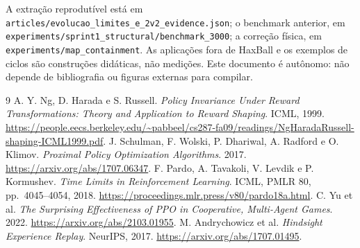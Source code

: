 \documentclass[11pt,a4paper]{article}
\newcommand{\code}[1]{\nolinkurl{#1}}
\begin{document}
A extração reprodutível está em \code{articles/evolucao_limites_e_2v2_evidence.json}; o benchmark anterior, em \code{experiments/sprint1_structural/benchmark_3000}; a correção física, em \code{experiments/map_containment}. As aplicações fora de HaxBall e os exemplos de ciclos são construções didáticas, não medições. Este documento é autônomo: não depende de bibliografia ou figuras externas para compilar.

\begin{thebibliography}{9}
 A. Y. Ng, D. Harada e S. Russell.
\emph{Policy Invariance Under Reward Transformations: Theory and Application to Reward Shaping}. ICML, 1999.
\url{https://people.eecs.berkeley.edu/~pabbeel/cs287-fa09/readings/NgHaradaRussell-shaping-ICML1999.pdf}.
 J. Schulman, F. Wolski, P. Dhariwal, A. Radford e O. Klimov.
\emph{Proximal Policy Optimization Algorithms}. 2017.
\url{https://arxiv.org/abs/1707.06347}.
 F. Pardo, A. Tavakoli, V. Levdik e P. Kormushev.
\emph{Time Limits in Reinforcement Learning}. ICML, PMLR 80, pp.~4045--4054, 2018.
\url{https://proceedings.mlr.press/v80/pardo18a.html}.
 C. Yu et al.
\emph{The Surprising Effectiveness of PPO in Cooperative, Multi-Agent Games}. 2022.
\url{https://arxiv.org/abs/2103.01955}.
 M. Andrychowicz et al.
\emph{Hindsight Experience Replay}. NeurIPS, 2017.
\url{https://arxiv.org/abs/1707.01495}.
\end{thebibliography}
\end{document}
